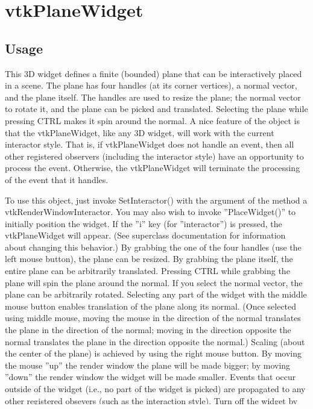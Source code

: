 \section{vtkPlaneWidget}

\subsection{Usage}

 This 3D widget defines a finite (bounded) plane that can be interactively
 placed in a scene. The plane has four handles (at its corner vertices), a
 normal vector, and the plane itself. The handles are used to resize the
 plane; the normal vector to rotate it, and the plane can be picked and
 translated. Selecting the plane while pressing CTRL makes it spin around 
 the normal. A nice feature of the object is that the vtkPlaneWidget, like
 any 3D widget, will work with the current interactor style. That is, if
 vtkPlaneWidget does not handle an event, then all other registered
 observers (including the interactor style) have an opportunity to process
 the event. Otherwise, the vtkPlaneWidget will terminate the processing of
 the event that it handles.

 To use this object, just invoke SetInteractor() with the argument of the
 method a vtkRenderWindowInteractor.  You may also wish to invoke
 ''PlaceWidget()'' to initially position the widget. If the ''i'' key (for
 ''interactor'') is pressed, the vtkPlaneWidget will appear. (See superclass
 documentation for information about changing this behavior.) By grabbing
 the one of the four handles (use the left mouse button), the plane can be
 resized.  By grabbing the plane itself, the entire plane can be
 arbitrarily translated. Pressing CTRL while grabbing the plane will spin
 the plane around the normal. If you select the normal vector, the plane can be
 arbitrarily rotated. Selecting any part of the widget with the middle
 mouse button enables translation of the plane along its normal. (Once
 selected using middle mouse, moving the mouse in the direction of the
 normal translates the plane in the direction of the normal; moving in the
 direction opposite the normal translates the plane in the direction
 opposite the normal.) Scaling (about the center of the plane) is achieved
 by using the right mouse button. By moving the mouse ''up'' the render
 window the plane will be made bigger; by moving ''down'' the render window
 the widget will be made smaller. Events that occur outside of the widget
 (i.e., no part of the widget is picked) are propagated to any other
 registered obsevers (such as the interaction style).  Turn off the widget
 by pressing the ''i'' key again (or invoke the Off() method).


